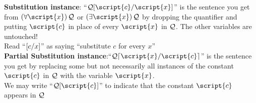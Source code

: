 \textbf{Substitution instance}: ``$\metav{Q}\substitute{\script{x}}{\script{c}}$'' is the sentence you get from $\qt{\forall}{\script{x}}\metav{Q}$ or $\qt{\exists}{\script{x}}\metav{Q}$ by dropping the quantifier and putting $\script{c}$ in place of every $\script{x}$ in $\metav{Q}$. The other variables are untouched! \\ Read ``$\substitute{x}{c}$'' as saying ``substitute $c$ for every $x$''\\[1ex]%
\textbf{Partial Substitution instance}:``$\metav{Q}\substitutesome{\script{c}}{\script{x}}$'' is the sentence you get by replacing some but not necessarily all instances of the constant $\script{c}$ in $\metav{Q}$ with the variable $\script{x}$. \\ We may write ``$\metav{Q}[\script{c}]$'' to indicate that the constant $\script{c}$ appears in $\metav{Q}$




